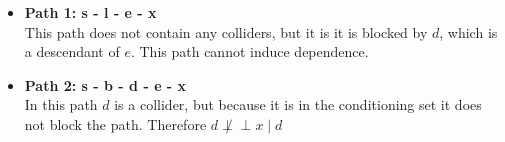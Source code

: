 \documentclass[12pt]{report}
\begin{document}
\begin{itemize}
    \item \textbf{Path 1: s - l - e - x}   \\    
    This path does not contain any colliders, but it is  it is blocked by $d$, which is a descendant of $e$. This path cannot induce dependence. 
    \item \textbf{Path 2: s - b - d - e - x} \\    
    In this path $d$ is a collider, but because it is in the conditioning set it does not block the path. 
    Therefore \(d \not\perp\!\!\!\perp x \mid d\)
\end{itemize}









\end{document}
